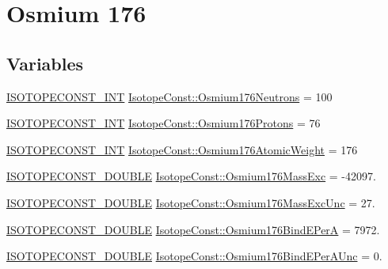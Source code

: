 \hypertarget{group___isotope_const-_osmium-_os176}{}\section{Osmium 176}
\label{group___isotope_const-_osmium-_os176}
\subsection*{Variables}
\begin{DoxyCompactItemize}
\item 
\mbox{\hyperlink{group___isotope_const-_macros_ga5f18360b3e99483a35c32d789e62621c}{I\+S\+O\+T\+O\+P\+E\+C\+O\+N\+S\+T\+\_\+\+I\+NT}} \mbox{\hyperlink{group___isotope_const-_osmium-_os176_ga1634f31c4473b7ce7aef735b67169339}{Isotope\+Const\+::\+Osmium176\+Neutrons}} = 100
\item 
\mbox{\hyperlink{group___isotope_const-_macros_ga5f18360b3e99483a35c32d789e62621c}{I\+S\+O\+T\+O\+P\+E\+C\+O\+N\+S\+T\+\_\+\+I\+NT}} \mbox{\hyperlink{group___isotope_const-_osmium-_os176_gab64914ffe59eacda1f0f9074119bf5c5}{Isotope\+Const\+::\+Osmium176\+Protons}} = 76
\item 
\mbox{\hyperlink{group___isotope_const-_macros_ga5f18360b3e99483a35c32d789e62621c}{I\+S\+O\+T\+O\+P\+E\+C\+O\+N\+S\+T\+\_\+\+I\+NT}} \mbox{\hyperlink{group___isotope_const-_osmium-_os176_ga48d22288acc7f2bc323025034151a7ec}{Isotope\+Const\+::\+Osmium176\+Atomic\+Weight}} = 176
\item 
\mbox{\hyperlink{group___isotope_const-_macros_ga8f45a7272ce02c0b4c65c44636ed719a}{I\+S\+O\+T\+O\+P\+E\+C\+O\+N\+S\+T\+\_\+\+D\+O\+U\+B\+LE}} \mbox{\hyperlink{group___isotope_const-_osmium-_os176_gac465e22f9e5aa46b5596cdb0a03a061b}{Isotope\+Const\+::\+Osmium176\+Mass\+Exc}} = -\/42097.
\item 
\mbox{\hyperlink{group___isotope_const-_macros_ga8f45a7272ce02c0b4c65c44636ed719a}{I\+S\+O\+T\+O\+P\+E\+C\+O\+N\+S\+T\+\_\+\+D\+O\+U\+B\+LE}} \mbox{\hyperlink{group___isotope_const-_osmium-_os176_ga1702a11248a3d801b81dc493aedbbc2d}{Isotope\+Const\+::\+Osmium176\+Mass\+Exc\+Unc}} = 27.
\item 
\mbox{\hyperlink{group___isotope_const-_macros_ga8f45a7272ce02c0b4c65c44636ed719a}{I\+S\+O\+T\+O\+P\+E\+C\+O\+N\+S\+T\+\_\+\+D\+O\+U\+B\+LE}} \mbox{\hyperlink{group___isotope_const-_osmium-_os176_ga507ab1822a3f830c45795d111a3ab6eb}{Isotope\+Const\+::\+Osmium176\+Bind\+E\+PerA}} = 7972.
\item 
\mbox{\hyperlink{group___isotope_const-_macros_ga8f45a7272ce02c0b4c65c44636ed719a}{I\+S\+O\+T\+O\+P\+E\+C\+O\+N\+S\+T\+\_\+\+D\+O\+U\+B\+LE}} \mbox{\hyperlink{group___isotope_const-_osmium-_os176_ga528c2d8ba304bbb2f39f83ccfa911f84}{Isotope\+Const\+::\+Osmium176\+Bind\+E\+Per\+A\+Unc}} = 0.

\end{DoxyCompactItemize}
